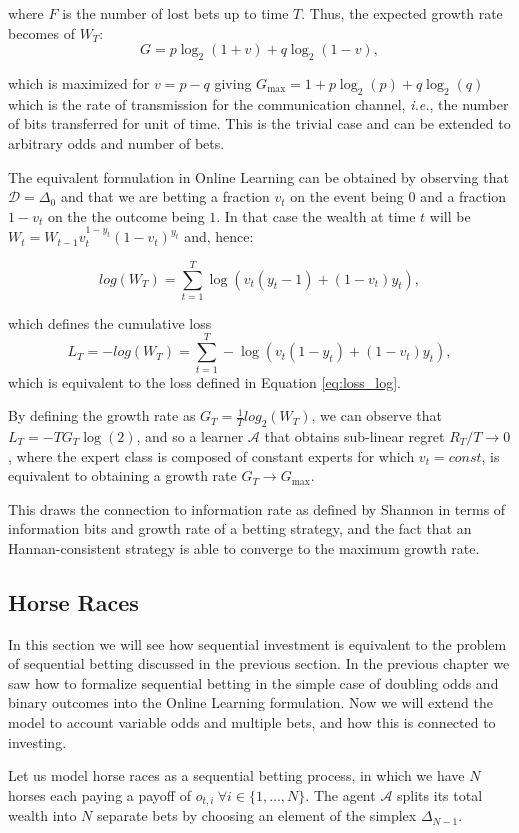 where $F$ is the number of lost bets up to time $T$. Thus, the expected growth rate becomes of $W_T$: 
$$G=p\log_2(1+v)+q\log_2(1-v),$$

which is maximized for $v=p-q$ giving $G_{\max}=1+p\log_2(p)+q\log_2(q)$ which is the rate of transmission for the communication channel, \emph{i.e.}, the number of bits transferred for unit of time. This is the trivial case and can be extended to arbitrary odds and number of bets.

The equivalent formulation in Online Learning can be obtained by observing that $\mathcal D=\Delta_0$ and that we are betting a fraction $v_t$ on the event being $0$ and a fraction $1-v_t$ on the the outcome being $1$. In that case the wealth at time $t$ will be $W_t=W_{t-1}v_t^{1-y_t}(1-v_t)^{y_t}$ and, hence: 

\begin{equation}
log(W_T)=\sum\limits_{t=1}^T\log(v_t(y_t-1)+(1-v_t)y_t),
\end{equation}

which defines the cumulative loss 
$$L_T=-log(W_T)=\sum\limits_{t=1}^T-\log(v_t(1-y_t)+(1-v_t)y_t),$$
which is equivalent to the loss defined in Equation \eqref{eq:loss_log}.

By defining the growth rate as $G_T=\frac{1}{T}log_2(W_T)$, we can observe that $L_T=-TG_T\log(2)$, and so a learner $\mathcal A$ that obtains sub-linear regret $R_T/T\to0$, where the expert class is composed of constant experts for which $v_t=const$, is equivalent to obtaining a growth rate $G_T\to G_{\max}$.

This draws the connection to information rate as defined by Shannon in terms of information bits and growth rate of a betting strategy, and the fact that an Hannan-consistent strategy is able to converge to the maximum growth rate. 

\subsection{Horse Races}

In this section we will see how sequential investment is equivalent to the problem of sequential betting discussed in the previous section.
In the previous chapter we saw how to formalize sequential betting in the simple case of doubling odds and binary outcomes into the Online Learning formulation. Now we will extend the model to account variable odds and multiple bets, and how this is connected to investing.

Let us model horse races as a sequential betting process, in which we have $N$ horses each paying a payoff of $o_{t,i}\ \forall i\in \{1,\ldots,N\}$. The agent $\mathcal A$ splits its total wealth into $N$ separate bets by choosing an element of the simplex $\Delta_{N-1}$.

